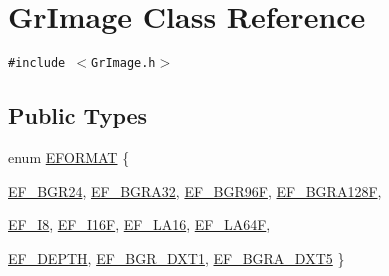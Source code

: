 \hypertarget{class_gr_image}{
\section{GrImage Class Reference}
\label{class_gr_image}
}
{\tt \#include $<$GrImage.h$>$}

\subsection*{Public Types}
\begin{CompactItemize}
\item 
enum \hyperlink{class_gr_image_55bbf2a220e037e07616bb9c3f049786}{EFORMAT} \{ \par
\hyperlink{class_gr_image_55bbf2a220e037e07616bb9c3f049786356d268f21e4db1aae7c7e36dfe3c247}{EF\_\-BGR24}, 
\hyperlink{class_gr_image_55bbf2a220e037e07616bb9c3f049786db8d3cc0284ad82ecdb9237383702dbd}{EF\_\-BGRA32}, 
\hyperlink{class_gr_image_55bbf2a220e037e07616bb9c3f0497862849db7623d305d03c10171534380f39}{EF\_\-BGR96F}, 
\hyperlink{class_gr_image_55bbf2a220e037e07616bb9c3f049786f09b7ae1c36d657ed15cd701306cdea7}{EF\_\-BGRA128F}, 
\par
\hyperlink{class_gr_image_55bbf2a220e037e07616bb9c3f049786a54c44d9d5b7aa6dbd156429857381d9}{EF\_\-I8}, 
\hyperlink{class_gr_image_55bbf2a220e037e07616bb9c3f049786361d515c8fd8c47359cfece968f1f2fe}{EF\_\-I16F}, 
\hyperlink{class_gr_image_55bbf2a220e037e07616bb9c3f0497862de663da4c35b7fe9a5d18311d58c7c3}{EF\_\-LA16}, 
\hyperlink{class_gr_image_55bbf2a220e037e07616bb9c3f049786cbe17f3c0511f360dd9b53884fa0866a}{EF\_\-LA64F}, 
\par
\hyperlink{class_gr_image_55bbf2a220e037e07616bb9c3f049786b9d6d2d7c4e777cd5a0fe5a306b98b2e}{EF\_\-DEPTH}, 
\hyperlink{class_gr_image_55bbf2a220e037e07616bb9c3f0497865c5f10f876b9ae7dd73aac384de111b9}{EF\_\-BGR\_\-DXT1}, 
\hyperlink{class_gr_image_55bbf2a220e037e07616bb9c3f0497869527d3b19e4c628284621359a6ac2fb1}{EF\_\-BGRA\_\-DXT5}
 \}

\end{CompactItemize}
